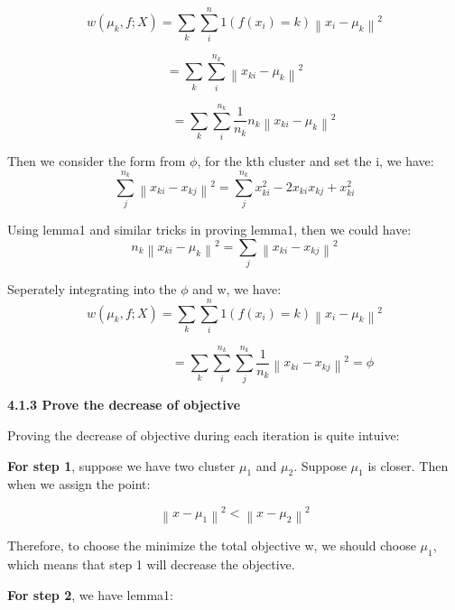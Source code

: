 \documentclass{article} %
\newcommand{\norm}[1]{\left\lVert #1 \right\rVert}
\begin{document}
\begin{equation}
w (\mu_k, f; X) = \sum_k \sum_i^n 1(f(x_i) = k) \norm{x_i - \mu_k}^2
\end{equation}

\begin{equation}
= \sum_k \sum_i^{n_k} \norm{x_{ki} - \mu_k}^2
\end{equation}

\begin{equation}
\qquad \quad
= \sum_k \sum_i^{n_k} \frac{1}{n_k} n_k \norm{x_{ki} - \mu_k}^2
\end{equation}

Then we consider the form from $\phi$, for the kth cluster and set the i, we have:
\begin{equation}
\sum_j^{n_k} \norm{x_{ki} - x_{kj}}^2 =
\sum_j^{n_k} x_{ki}^2 - 2x_{ki} x_{kj} + x_{ki}^2
\end{equation}

Using lemma1 and similar tricks in proving lemma1, then we could have:
\begin{equation}
n_k \norm{x_{ki} - \mu_k}^2 = \sum_j \norm{x_{ki} - x_{kj}}^2
\end{equation}

Seperately integrating into the $\phi$ and w, we have:
\begin{equation}
w (\mu_k, f; X) = \sum_k \sum_i^n 1(f(x_i) = k) \norm{x_i - \mu_k}^2
\end{equation}

\begin{equation}
\qquad \qquad \qquad
= \sum_k \sum_i^{n_k} \sum_j^{n_k} \frac{1}{n_k} \norm{x_{ki} - x_{kj}}^2 = \phi
\end{equation}

\textbf{4.1.3 Prove the decrease of objective}

Proving the decrease of objective during each iteration is quite intuive:

\textbf{For step 1}, suppose we have two cluster $\mu_1$ and $\mu_2$. Suppose $\mu_1$ is
closer. Then when we assign the point:

\begin{equation}
\norm{x - \mu_1}^2 < \norm{x - \mu_2}^2
\end{equation}

Therefore, to choose the minimize the total objective w, we should choose
$\mu_1$, which means that step 1 will decrease the objective.

\textbf{For step 2}, we have lemma1:
\end{document}

